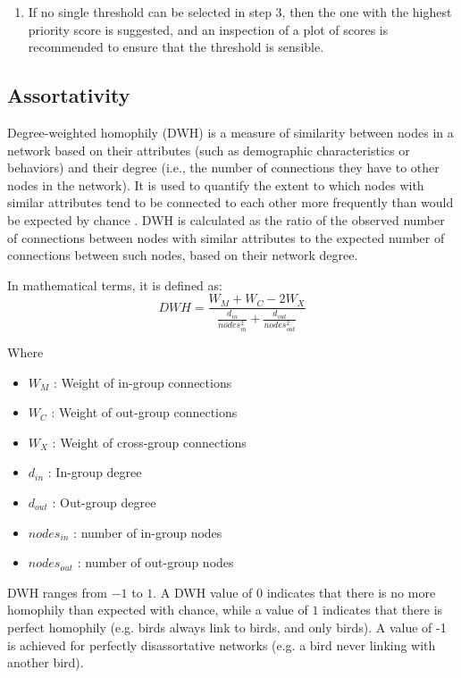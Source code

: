 \documentclass[utf8]{FrontiersinHarvard} %
\begin{document}
\begin{enumerate}
	\item{If no single threshold can be selected in step 3, then the one with the highest priority score is suggested, and an inspection of a plot of scores is recommended to ensure that the threshold is sensible.}
\end{enumerate}

\subsection{Assortativity}

Degree-weighted homophily (DWH) is a measure of similarity between nodes in a
network based on their attributes (such as demographic characteristics or
behaviors) and their degree (i.e., the number of connections they have to other
nodes in the network). It is used to quantify the extent to which nodes with
similar attributes tend to be connected to each other more frequently than
would be expected by chance \citep{golub_how_2012}. DWH is calculated as the ratio
of the observed number of connections between nodes with similar attributes to
the expected number of connections between such nodes, based on their network
degree.

In mathematical terms, it is defined as:
\begin{equation}
	DWH = \frac{W_M + W_C - 2W_X}{\frac{d_{in}}{nodes_{in}^2} + \frac{d_{out}}{nodes_{out}^2}}
\end{equation}

Where
\begin{itemize}
	\item{$W_M$ : Weight of in-group connections}
	\item{$W_C$ : Weight of out-group connections}
	\item{$W_X$ : Weight of cross-group connections}
	\item{$d_{in}$ : In-group degree}
	\item{$d_{out}$ : Out-group degree}
	\item{$nodes_{in}$ : number of in-group nodes}
	\item{$nodes_{out}$ : number of out-group nodes}
\end{itemize}

DWH ranges from $-1$ to $1$. A DWH value of $0$ indicates that there is no more
homophily than expected with chance, while a value of $1$ indicates that there
is perfect homophily (e.g. birds always link to birds, and only birds). A value
of -1 is achieved for perfectly disassortative networks (e.g. a bird never
linking with another bird).
\end{document}
